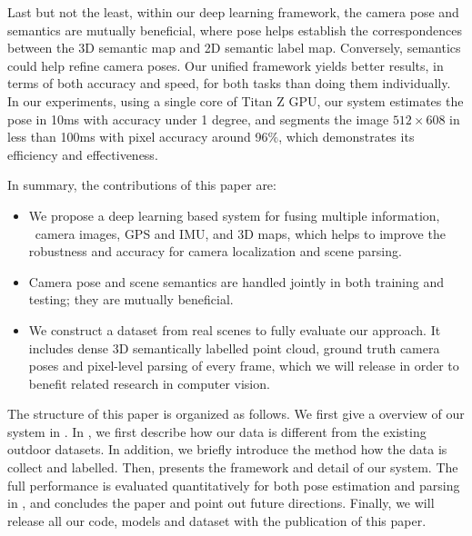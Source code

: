 Last but not the least, within our deep learning framework, the camera pose and semantics are mutually beneficial, where pose helps establish the correspondences between the 3D semantic map and 2D semantic label map. Conversely, semantics could help refine camera poses. Our unified framework yields better results, in terms of both accuracy and speed, for both tasks than doing them individually. In our experiments, using a single core of Titan Z GPU, our system estimates the pose in 10ms with accuracy under 1 degree, and segments the image $512 \times 608$ in less than 100ms with pixel accuracy around 96$\%$, which demonstrates its efficiency and effectiveness.

In summary, the contributions of this paper are:
\begin{itemize}
    \item We propose a deep learning based system for fusing multiple information, \ie~camera images, GPS and IMU, and 3D maps, which helps to improve the robustness and accuracy for camera localization and scene parsing.
    \item Camera pose and scene semantics are handled jointly in both training and testing; they are mutually beneficial.
    \item We construct a dataset from real scenes to fully evaluate our approach. It includes dense 3D semantically labelled point cloud, ground truth camera poses and pixel-level parsing of every frame, which we will release in order to benefit related research in computer vision.
\end{itemize}

The structure of this paper is organized as follows. We first give a overview of our system in . In , we first describe how our data is different from the existing outdoor datasets. In addition, we briefly introduce the method how the data is collect and labelled. Then,  presents the framework and detail of our system. The full performance is evaluated quantitatively for both pose estimation and parsing in , and  concludes the paper and point out future directions. Finally, we will release all our code, models and dataset with the publication of this paper.


